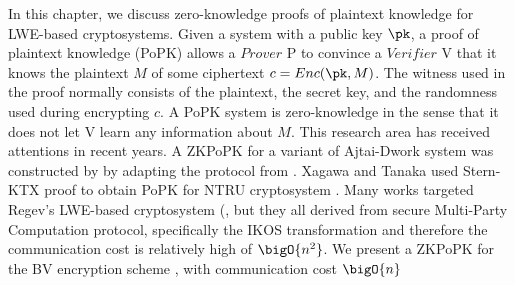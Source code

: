 In this chapter, we discuss zero-knowledge proofs of plaintext knowledge for 
LWE-based cryptosystems. Given a system with a public key $\pk$, a proof of 
plaintext knowledge (PoPK) allows a $Prover$ P to convince a $Verifier$ V that 
it knows the plaintext $M$ of some ciphertext $c = Enc(\pk, M)$. The witness 
used in the proof normally consists of the plaintext, the secret key, and the 
randomness used during encrypting $c$. A PoPK system is zero-knowledge in the 
sense that it does not let V learn any information about $M$. This research
area has received attentions in recent years. A ZKPoPK for a variant of Ajtai-Dwork
system \cite{ajtai1997public} was constructed by \cite{goldreich1999approximating} 
by adapting the protocol from \cite{micciancio2003statistical}. Xagawa and Tanaka 
\cite{xagawa2009zero} used Stern-KTX proof \cite{stern1993new, kawachi2008concurrently}
to obtain PoPK for NTRU cryptosystem \cite{hoffstein1998ntru}. Many works targeted 
Regev's LWE-based cryptosystem (\cite{bendlin2010threshold, bendlin2011semi, asharov2012multiparty},
but they all derived from secure Multi-Party Computation protocol, specifically the IKOS
transformation \cite{ishai2007zero} and therefore the communication cost is 
relatively high of $\bigO{n^2}$. We present a ZKPoPK for the BV encryption scheme \cite{brakerski2011fully}, with communication cost $\bigO{n}$








